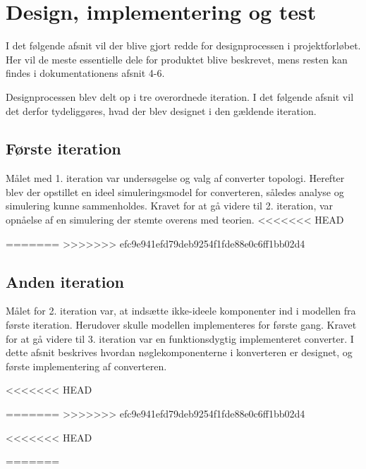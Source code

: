 \chapter{Design, implementering og test}
I det følgende afsnit vil der blive gjort redde for designprocessen i projektforløbet. Her vil de meste essentielle dele for produktet blive beskrevet, mens resten kan findes i dokumentationens afsnit 4-6.

Designprocessen blev delt op i tre overordnede iteration. I det følgende afsnit vil det derfor tydeliggøres, hvad der blev designet i den gældende iteration. 


\section{Første iteration}
Målet med 1. iteration var undersøgelse og valg af converter topologi. Herefter blev der opstillet en ideel simuleringsmodel for converteren, således analyse og simulering kunne sammenholdes. 
Kravet for at gå videre til 2. iteration, var opnåelse af en simulering der stemte overens med teorien. 
<<<<<<< HEAD


=======
>>>>>>> efc9e941efd79deb9254f1fde88e0c6ff1bb02d4





\section{Anden iteration}
Målet for 2. iteration var, at indsætte ikke-ideele komponenter ind i modellen fra første iteration. Herudover skulle modellen implementeres for første gang. 
Kravet for at gå videre til 3. iteration var en funktionsdygtig implementeret converter. 
I dette afsnit beskrives hvordan nøglekomponenterne i konverteren er designet, og første implementering af converteren.


<<<<<<< HEAD

=======
>>>>>>> efc9e941efd79deb9254f1fde88e0c6ff1bb02d4









<<<<<<< HEAD

=======


